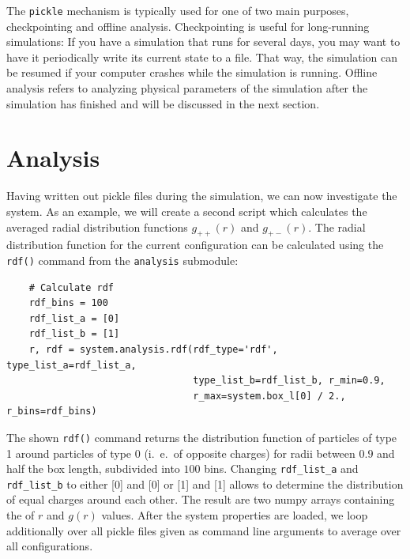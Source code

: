 \documentclass[
a4paper,                        %
11pt,                           %
twoside,                        %
footsepline,                    %
headsepline,                    %
headexclude,                    %
footexclude,                    %
pagesize,                       %
]{scrartcl}
\begin{document}
The \verb|pickle| mechanism is typically used for one of two main
purposes, checkpointing and offline analysis.
Checkpointing is useful for long-running simulations: If you have
a simulation that runs for several days, you may want to have it
periodically write its current state to a file. That way, the
simulation can be resumed if your computer crashes while the
simulation is running.
Offline analysis refers to analyzing physical parameters of the
simulation after the simulation has finished and will be discussed in
the next section.

\section{Analysis}

Having written out pickle files during the simulation, we can now
investigate the system. As an example, we will create a second script which 
calculates the averaged radial distribution functions $g_{++}(r)$ and 
$g_{+-}(r)$. The radial distribution function for the current 
configuration can be calculated using the \verb|rdf()| command from the 
\verb|analysis| submodule:

\begin{lstlisting}
    # Calculate rdf
    rdf_bins = 100
    rdf_list_a = [0]
    rdf_list_b = [1]
    r, rdf = system.analysis.rdf(rdf_type='rdf', type_list_a=rdf_list_a,
                                 type_list_b=rdf_list_b, r_min=0.9,
                                 r_max=system.box_l[0] / 2., r_bins=rdf_bins)
\end{lstlisting}


The shown \verb|rdf()| command returns the distribution function
of particles of type 1 around particles of type 0 (i.~e.\ of opposite
charges) for radii between $0.9$ and half the box length, subdivided
into $100$ bins.  Changing \verb|rdf_list_a| and \verb|rdf_list_b| to either 
[0] and [0] or [1] and [1] allows to determine the distribution of equal charges
around each other. The result are two numpy arrays containing the of $r$ and 
$g(r)$ values.
After the system properties are loaded, we loop additionally over all pickle 
files given as command line arguments to average over all configurations.
\end{document}
